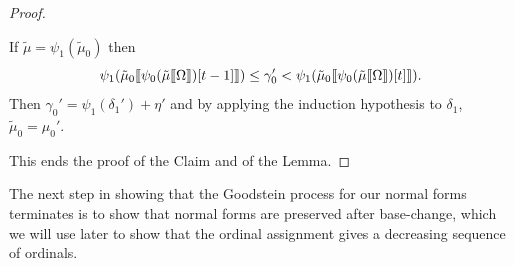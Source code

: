 \documentclass{amsart}
\theoremstyle{plain}
\theoremstyle{plain}
\def\scbrl{[\hspace{-.14em}[}
\def\scbrr{]\hspace{-.14em}]}
\def\scbr#1{\scbrl#1\scbrr}
\newcommand{\Om}{{\Omega}}
\newcommand{\ga}{\gamma}
\newcommand{\de}{\delta}
\def\scbrl{[\hspace{-.14em}[}
\def\scbrr{]\hspace{-.14em}]}
\def\scbr#1{\scbrl#1\scbrr}
\begin{document}
\begin{proof}
\begin{Cases}
\begin{Cases}
    \item
    If $\tilde{\mu} = \psi_1(\tilde{\mu}_0)$ then
    $$\psi_1(\tilde{\mu}_0 \scbr{\psi_0(\tilde{\mu}\scbr{\Om})[t-1]}) \leq  \ga_0' < \psi_1(\tilde{\mu}_0 \scbr{\psi_0(\tilde{\mu}\scbr{\Om})[t]}).$$
    Then $\ga_0' = \psi_1(\de_1') + \eta'$ and by applying the induction hypothesis to $\de_1$, $\tilde{\mu}_0=\mu_0'$.
    \end{Cases}
\end{Cases}
This ends the proof of the Claim and of the Lemma.
\end{proof}
\smallskip
The next step in showing that the Goodstein process for our normal forms terminates is to show that normal forms are preserved after base-change, which we will use later to show that the ordinal assignment gives a decreasing sequence of ordinals.\smallskip
\end{document}

